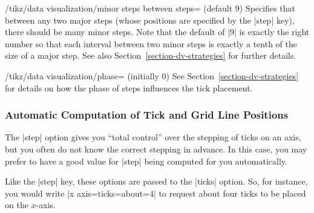 \begin{key}{/tikz/data visualization/minor steps between steps= (default 9)}
    Specifies that between any two major steps (whose positions are specified
    by the |step| key), there should be  many minor steps. Note
    that the default of |9| is exactly the right number so that each interval
    between two minor steps is exactly a tenth of the size of a major step. See
    also Section~\ref{section-dv-strategies} for further details.
\begin{codeexample}[preamble={\usetikzlibrary{datavisualization.formats.functions}}]
\end{codeexample}
\end{key}

\begin{key}{/tikz/data visualization/phase= (initially 0)}
    See Section~\ref{section-dv-strategies} for details on how the phase of
    steps influences the tick placement.
\end{key}


\subsubsection{Automatic Computation of Tick and Grid Line Positions}

The |step| option gives you ``total control'' over the stepping of ticks on an
axis, but you often do not know the correct stepping in advance. In this case,
you may prefer to have a good value for |step| being computed for you
automatically.

Like the |step| key, these options are passed to the |ticks| option. So, for
instance, you would write |x axis={ticks={about=4}}| to request about four
ticks to be placed on the $x$-axis.

